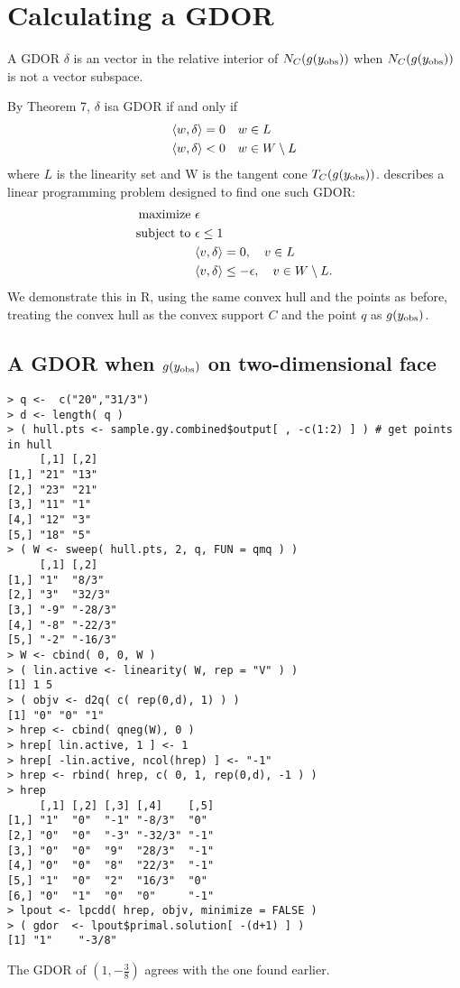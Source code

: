 \section{Calculating a GDOR}
A GDOR $\delta$ is an vector in the relative interior of $N_C(g(y_{\text{obs}}))$ when
$N_C(g(y_{\text{obs}}))$ is not a vector subspace.  

By Theorem 7, $\delta$ isa GDOR if and only if
\begin{align*}
	\langle w,\delta \rangle & = 0 	\quad w \in L\\
	\langle w,\delta \rangle & < 0 	\quad w \in W \setminus L
\end{align*}
where $L$ is the linearity set and W is the tangent cone $T_C(g(y_{\text{obs}}))$.
\citet{Geyer:gdor} describes a linear programming problem designed to find one
such GDOR:
\begin{align*}
	\text{maximize } 	&\epsilon\\
	\text{subject to } 	&\epsilon \leq 1\\
	&\langle v,\delta \rangle = 0, \quad v \in L \\
	&\langle v,\delta \rangle \leq -\epsilon, \quad v \in W \setminus L.
\end{align*}
We demonstrate this in R, using the same convex hull and the points as before,
treating the convex hull as the convex support $C$ and the point $q$ as $g(y_{\text{obs}})$.
\subsection{A GDOR when $g(y_{\text{obs}})$ on two-dimensional face}
\begin{verbatim}
> q <-  c("20","31/3")
> d <- length( q )
> ( hull.pts <- sample.gy.combined$output[ , -c(1:2) ] ) # get points in hull
     [,1] [,2]
[1,] "21" "13"
[2,] "23" "21"
[3,] "11" "1" 
[4,] "12" "3" 
[5,] "18" "5" 
> ( W <- sweep( hull.pts, 2, q, FUN = qmq ) )
     [,1] [,2]   
[1,] "1"  "8/3"  
[2,] "3"  "32/3" 
[3,] "-9" "-28/3"
[4,] "-8" "-22/3"
[5,] "-2" "-16/3"
> W <- cbind( 0, 0, W )
> ( lin.active <- linearity( W, rep = "V" ) )
[1] 1 5
> ( objv <- d2q( c( rep(0,d), 1) ) )
[1] "0" "0" "1"
> hrep <- cbind( qneg(W), 0 ) 
> hrep[ lin.active, 1 ] <- 1
> hrep[ -lin.active, ncol(hrep) ] <- "-1"
> hrep <- rbind( hrep, c( 0, 1, rep(0,d), -1 ) )
> hrep
     [,1] [,2] [,3] [,4]    [,5]
[1,] "1"  "0"  "-1" "-8/3"  "0" 
[2,] "0"  "0"  "-3" "-32/3" "-1"
[3,] "0"  "0"  "9"  "28/3"  "-1"
[4,] "0"  "0"  "8"  "22/3"  "-1"
[5,] "1"  "0"  "2"  "16/3"  "0" 
[6,] "0"  "1"  "0"  "0"     "-1"
> lpout <- lpcdd( hrep, objv, minimize = FALSE )
> ( gdor  <- lpout$primal.solution[ -(d+1) ] )
[1] "1"    "-3/8"
\end{verbatim}
The GDOR of $(1, -\frac{3}{8} )$ agrees with the one found earlier.

